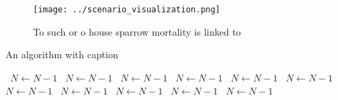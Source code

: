 \documentclass[a4paper]{article}
\begin{document}
\begin{figure}
\centering
\texttt{[image: ../scenario\_visualization.png]}
\caption{To such or o house sparrow mortality is linked to
}
\end{figure}
 
\begin{algorithm}
\caption{An algorithm with caption}
\begin{algorithmic}
\    \State $N \gets N - 1$
\    \State $N \gets N - 1$
\    \State $N \gets N - 1$
\    \State $N \gets N - 1$
\    \State $N \gets N - 1$
\    \State $N \gets N - 1$
\    \State $N \gets N - 1$
\    \State $N \gets N - 1$
\    \State $N \gets N - 1$
\    \State $N \gets N - 1$
\    \State $N \gets N - 1$
\EndWhile
\end{algorithmic}
\end{algorithm}
\end{document}
